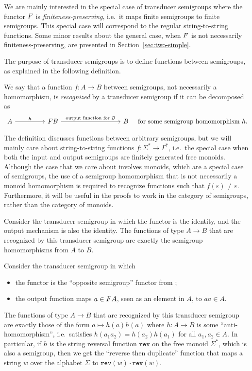 We are mainly interested in the special case of transducer semigroups where the functor $\functor$ is \emph{finiteness-preserving}, i.e.~it maps finite semigroups to finite semigroups. This special case will correspond to the regular string-to-string functions. Some minor results about the general case, when $\functor$ is not necessarily finiteness-preserving, are presented in Section~\ref{sec:two-simple}.

The purpose of transducer semigroups is to define functions between semigroups, as explained in the following definition. 
\begin{definition}
 We say that a function $f\colon A \to B$ between semigroups, not necessarily a homomorphism, is \emph{recognized} by a transducer semigroup if it can be decomposed as
 \[
 \begin{tikzcd}
 [column sep=1.6cm]
 A 
 \ar[r,"h"]
 &
 \functor B
 \ar[rr,"\text{output function for $B$}"]
 &&
 B
 \end{tikzcd}
 \quad
 \text{for some semigroup homomorphism}\ h.
 \]
\end{definition}
The definition discusses functions between arbitrary semigroups, but we will
mainly care about string-to-string functions $f\colon \Sigma^* \to \Gamma^*$,
i.e.~the special case when both the input and output semigroups are finitely
generated free monoids. Although the case that we care about involves monoids,
which are a special case of semigroups, the use of a semigroup homomorphism that
is not necessarily a monoid homomorphism is required to recognize functions such
that $f(\varepsilon)\neq\varepsilon$. Furthermore, it will be useful in the
proofs to work in the category of semigroups, rather than the category of monoids.

\begin{example}
 Consider the transducer semigroup in which the functor is the identity, and the output mechanism is also the identity. The functions of type $A \to B$ that are recognized by this transducer semigroup are exactly the semigroup homomorphisms from $A$ to $B$.
\end{example}

\begin{example}\label{ex:reverse-duplicate}
  Consider the transducer semigroup in which
  \begin{itemize}
  \item the functor is the \enquote{opposite semigroup} functor from
    ;
  \item the output function maps $a\in\functor A$, seen as an element in $A$, to
    $aa \in A$.
  \end{itemize}
  The functions of type $A \to B$ that are recognized by this transducer
  semigroup are exactly those of the form $a \mapsto h(a)h(a)$ where $h\colon A
  \to B$ is some \enquote{anti-homomorphism}, i.e.\ satisfies
  $h(a_1a_2)=h(a_2)h(a_1)$ for all $a_1,a_2\in A$. In particular, if $h$ is the
  string reversal function $\mathtt{rev}$ on the free monoid $\Sigma^*$, which
  is also a semigroup, then we get the \enquote{reverse then duplicate} function
  that maps a string $w$ over the alphabet $\Sigma$ to $\mathtt{rev}(w) \cdot
  \mathtt{rev}(w)$.
\end{example}

